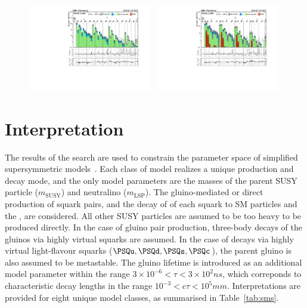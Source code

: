 \begin{figure}[!t]
  \includegraphics[width=0.48\textwidth, trim=10 0 60 10, clip=true]{Figures/5jet_cr-only.pdf}~
  \includegraphics[width=0.48\textwidth, trim=10 0 60 10, clip=true]{Figures/6jet_cr-only.pdf}\\
  \label{fig:result}
\end{figure}


\clearpage
\section{Interpretation}
\label{sec:interpretations}

The results of the search are used to constrain the parameter space of
simplified supersymmetric models~\cite{Alwall:2008ag, Alwall:2008va,
  sms}. Each class of model realizes a unique production and decay
mode, and the only model parameters are the masses of the parent SUSY
particle ($m_\text{SUSY}$) and neutralino ($m_\text{LSP}$). The
gluino-mediated or direct production of squark pairs, and the decay of
of each squark to SM particles and the \chiz, are considered. All
other SUSY particles are assumed to be too heavy to be produced
directly. In the case of gluino pair production, three-body decays of
the gluinos via highly virtual squarks are assumed. In the case of
decays via highly virtual light-flavour squarks ($\PSQu, \PSQd, \PSQs,
\PSQc$), the parent gluino is also assumed to be metastable. The
gluino lifetime is introduced as an additional model parameter within
the range $3{\times}10^{-6} < \tau < 3{\times}10^{2}\unit{ns}$, which
correponds to characteristic decay lengths in the range $10^{-3} <
c\tau < 10^{5}\unit{mm}$. Interpretations are provided for eight
unique model classes, as summarised in Table~\ref{tab:sms}.

